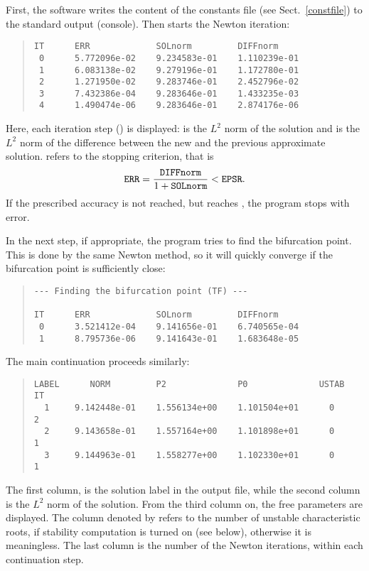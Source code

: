 \documentclass[10pt,a4paper]{ddedoc}
\begin{document}
First, the software writes the content of the constants file (see Sect.\ \ref{constfile}) to the standard output (console). Then starts the Newton iteration:
{ \small \begin{quote} \begin{lstlisting}[basicstyle=\tt,frame=single]
IT      ERR             SOLnorm         DIFFnorm
 0      5.772096e-02    9.234583e-01    1.110239e-01
 1      6.083138e-02    9.279196e-01    1.172780e-01
 2      1.271950e-02    9.283746e-01    2.452796e-02
 3      7.432386e-04    9.283646e-01    1.433235e-03
 4      1.490474e-06    9.283646e-01    2.874176e-06
\end{lstlisting} \end{quote} } \noindent
Here, each iteration step () is displayed:  is the $L^2$ norm of the solution and  is the $L^2$ norm of the difference between the new and the previous approximate solution.  refers to the stopping criterion, that is
\[
	{\tt ERR} = \frac{{\tt DIFFnorm}}{1+{\tt SOLnorm}} < {\tt EPSR}.
\]
If the prescribed accuracy is not reached, but  reaches , the program stops with error.

In the next step, if appropriate, the program tries to find the bifurcation point. This is done by the same Newton method, so it will quickly converge if the bifurcation point is sufficiently close:
{ \small \begin{quote} \begin{lstlisting}[basicstyle=\tt,frame=single]
--- Finding the bifurcation point (TF) ---

IT      ERR             SOLnorm         DIFFnorm
 0      3.521412e-04    9.141656e-01    6.740565e-04
 1      8.795736e-06    9.141643e-01    1.683648e-05
\end{lstlisting} \end{quote} } \noindent

The main continuation proceeds similarly:
{ \small \begin{quote} \begin{lstlisting}[basicstyle=\tt,frame=single]
LABEL      NORM         P2              P0              USTAB   IT
  1     9.142448e-01    1.556134e+00    1.101504e+01      0     2
  2     9.143658e-01    1.557164e+00    1.101898e+01      0     1
  3     9.144963e-01    1.558277e+00    1.102330e+01      0     1
\end{lstlisting} \end{quote} } \noindent
The first column,  is the solution label in the output file, while the second column is the $L^2$ norm of the solution. From the third column on, the free parameters are displayed. The column denoted by  refers to the number of unstable characteristic roots, if stability computation is turned on (see  below), otherwise it is meaningless. The last column is the number of the Newton iterations, within each continuation step.
\end{document}
